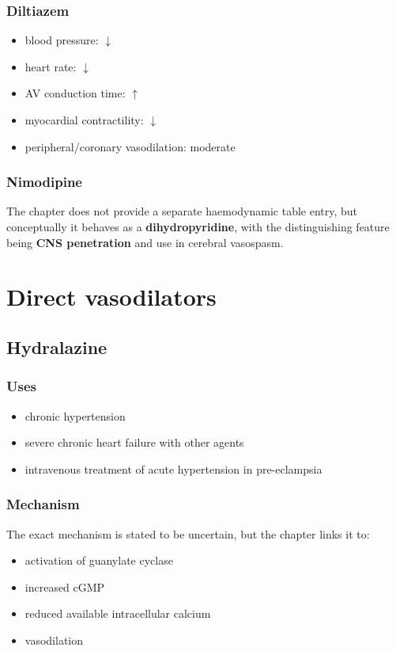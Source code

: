 \documentclass[11pt,a4paper]{article}
\begin{document}
\subsubsection*{Diltiazem}
\begin{itemize}
    \item blood pressure: $\downarrow$
    \item heart rate: $\downarrow$
    \item AV conduction time: $\uparrow$
    \item myocardial contractility: $\downarrow$
    \item peripheral/coronary vasodilation: moderate
\end{itemize}

\subsubsection*{Nimodipine}
The chapter does not provide a separate haemodynamic table entry, but conceptually it behaves as a \textbf{dihydropyridine}, with the distinguishing feature being \textbf{CNS penetration} and use in cerebral vasospasm.

\section{Direct vasodilators}

\subsection{Hydralazine}

\subsubsection*{Uses}
\begin{itemize}
    \item chronic hypertension
    \item severe chronic heart failure with other agents
    \item intravenous treatment of acute hypertension in pre-eclampsia
\end{itemize}

\subsubsection*{Mechanism}

The exact mechanism is stated to be uncertain, but the chapter links it to:
\begin{itemize}
    \item activation of guanylate cyclase
    \item increased cGMP
    \item reduced available intracellular calcium
    \item vasodilation
\end{itemize}
\end{document}

